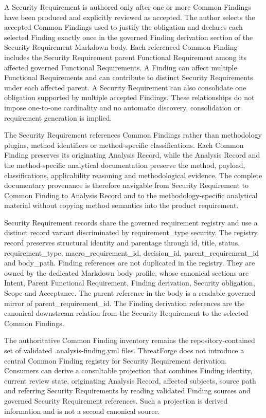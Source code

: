 \documentclass[
  10pt,
]{article}
\begin{document}
A Security Requirement is authored only after one or more Common
Findings have been produced and explicitly reviewed as accepted. The
author selects the accepted Common Findings used to justify the
obligation and declares each selected Finding exactly once in the
governed Finding derivation section of the Security Requirement Markdown
body. Each referenced Common Finding includes the Security Requirement
parent Functional Requirement among its affected governed Functional
Requirements. A Finding can affect multiple Functional Requirements and
can contribute to distinct Security Requirements under each affected
parent. A Security Requirement can also consolidate one obligation
supported by multiple accepted Findings. These relationships do not
impose one-to-one cardinality and no automatic discovery, consolidation
or requirement generation is implied.

The Security Requirement references Common Findings rather than
methodology plugins, method identifiers or method-specific
classifications. Each Common Finding preserves its originating Analysis
Record, while the Analysis Record and the method-specific analytical
documentation preserve the method, payload, classifications,
applicability reasoning and methodological evidence. The complete
documentary provenance is therefore navigable from Security Requirement
to Common Finding to Analysis Record and to the methodology-specific
analytical material without copying method semantics into the product
requirement.

Security Requirement records share the governed requirement registry and
use a distinct record variant discriminated by requirement\_type
security. The registry record preserves structural identity and
parentage through id, title, status, requirement\_type,
macro\_requirement\_id, decision\_id, parent\_requirement\_id and
body\_path. Finding references are not duplicated in the registry. They
are owned by the dedicated Markdown body profile, whose canonical
sections are Intent, Parent Functional Requirement, Finding derivation,
Security obligation, Scope and Acceptance. The parent reference in the
body is a readable governed mirror of parent\_requirement\_id. The
Finding derivation references are the canonical downstream relation from
the Security Requirement to the selected Common Findings.

The authoritative Common Finding inventory remains the
repository-contained set of validated .analysis-finding.yml files.
ThreatForge does not introduce a central Common Finding registry for
Security Requirement derivation. Consumers can derive a consultable
projection that combines Finding identity, current review state,
originating Analysis Record, affected subjects, source path and
referring Security Requirements by reading validated Finding sources and
governed Security Requirement references. Such a projection is derived
information and is not a second canonical source.
\end{document}
